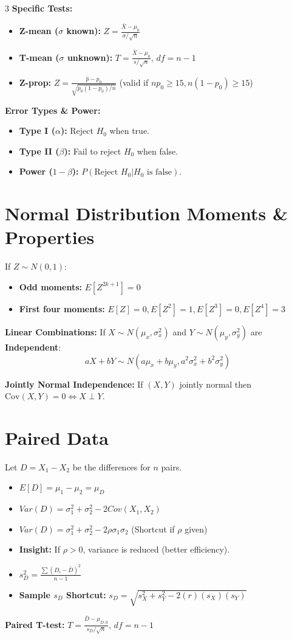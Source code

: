 \documentclass[10pt]{article}
\begin{document}
\begin{multicols}{3}
\textbf{Specific Tests:}
\begin{itemize}
    \item \textbf{Z-mean ($\sigma$ known):} $Z = \frac{\bar{X} - \mu_0}{\sigma/\sqrt{n}}$
    \item \textbf{T-mean ($\sigma$ unknown):} $T = \frac{\bar{X} - \mu_0}{s/\sqrt{n}}, \, df = n-1$
    \item \textbf{Z-prop:} $Z = \frac{\hat{p} - p_0}{\sqrt{p_0(1-p_0)/n}}$ (valid if $np_0 \ge 15, n(1-p_0) \ge 15$)
\end{itemize}

\textbf{Error Types \& Power:}
\begin{itemize}
    \item \textbf{Type I ($\alpha$):} Reject $H_0$ when true.
    \item \textbf{Type II ($\beta$):} Fail to reject $H_0$ when false.
    \item \textbf{Power ($1-\beta$):} $P(\text{Reject } H_0 | H_0 \text{ is false})$.
\end{itemize}

\section*{Normal Distribution Moments \& Properties}
If $Z \sim N(0,1)$:
\begin{itemize}
    \item \textbf{Odd moments:} $E[Z^{2k+1}] = 0$
    \item \textbf{First four moments:} $E[Z]=0, E[Z^2]=1, E[Z^3]=0, E[Z^4]=3$
\end{itemize}

\textbf{Linear Combinations:} If $X \sim N(\mu_x, \sigma_x^2)$ and $Y \sim N(\mu_y, \sigma_y^2)$ are \textbf{Independent}:
\[ aX + bY \sim N(a\mu_x + b\mu_y, a^2\sigma_x^2 + b^2\sigma_y^2) \]

\textbf{Jointly Normal Independence:} If $(X,Y)$ jointly normal then $\text{Cov}(X,Y) = 0 \iff X \perp Y$.

\section*{Paired Data}
Let $D = X_1 - X_2$ be the differences for $n$ pairs.
\begin{itemize}
    \item $E[D] = \mu_1 - \mu_2 = \mu_D$
    \item $Var(D) = \sigma_1^2 + \sigma_2^2 - 2Cov(X_1, X_2)$
    \item $Var(D) = \sigma_1^2 + \sigma_2^2 - 2\rho\sigma_1\sigma_2$ (Shortcut if $\rho$ given)
    \item \textbf{Insight:} If $\rho > 0$, variance is reduced (better efficiency).
    \item $s_D^2 = \frac{\sum (D_i - \bar{D})^2}{n-1}$
    \item \textbf{Sample $s_D$ Shortcut:} $s_D = \sqrt{s_X^2 + s_Y^2 - 2(r)(s_X)(s_Y)}$
\end{itemize}
\textbf{Paired T-test:} $T = \frac{\bar{D} - \mu_{D,0}}{s_D / \sqrt{n}}, \, df = n - 1$


\end{multicols}
\end{document}
